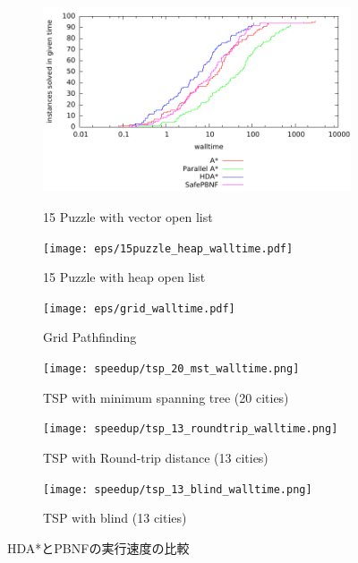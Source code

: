 \documentclass{jsarticle}
\begin{document}
\begin{figure}
	\centering
	\begin{subfigure}{0.6\columnwidth}
		\includegraphics[width=\columnwidth]{eps/15puzzle_vector_walltime.pdf}
		\label{fig:15puzzle_vector}
		\caption{15 Puzzle with vector open list}
	\end{subfigure}

	\begin{subfigure}{0.6\columnwidth}
		\texttt{[image: eps/15puzzle\_heap\_walltime.pdf]}
		\label{fig:15puzzle_vector}
		\caption{15 Puzzle with heap open list}
	\end{subfigure}

	\begin{subfigure}{0.6\columnwidth}
		\texttt{[image: eps/grid\_walltime.pdf]}
		\label{fig:grid}
		\caption{Grid Pathfinding}
	\end{subfigure}

	\begin{subfigure}{0.6\columnwidth}
		\texttt{[image: speedup/tsp\_20\_mst\_walltime.png]}
		\label{fig:tsp_20_mst}
		\caption{TSP with minimum spanning tree (20 cities)}
	\end{subfigure}

	\begin{subfigure}{0.6\columnwidth}
		\texttt{[image: speedup/tsp\_13\_roundtrip\_walltime.png]}
		\label{fig:tsp_13_round}
		\caption{TSP with Round-trip distance (13 cities)}
	\end{subfigure}

	\begin{subfigure}{0.6\columnwidth}
		\texttt{[image: speedup/tsp\_13\_blind\_walltime.png]}
		\label{fig:tsp_13_blind}
		\caption{TSP with blind (13 cities)}
	\end{subfigure}
	\label{fig:comparison}
	\caption{HDA*とPBNFの実行速度の比較}
\end{figure}%
\end{document}
